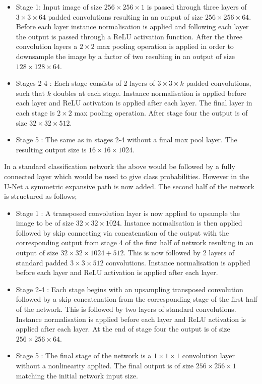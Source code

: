 \begin{itemize}
    \item Stage 1: Input image of size $256 \times 256 \times 1$ is passed through three layers of $3 \times 3 \times 64$ padded convolutions resulting in an output of
    size $256 \times 256 \times 64$. Before each layer instance normalisation is applied and following each layer the output is passed through a ReLU activation 
    function. After the three convolution layers a $2 \times 2$ max pooling operation is applied in order to downsample the image by a factor of two resulting in an output 
    of size $128 \times 128 \times 64$.
    \item Stages 2-4 : Each stage consists of 2 layers of $3 \times 3 \times k$ padded convolutions, such that $k$ doubles at each stage. Instance normalisation is applied before
    each layer and ReLU activation is applied after each layer. The final layer in each stage is $2 \times 2$ max pooling operation. After stage four the output is of size $32 \times 32 \times 512$.  
    \item Stage 5 : The same as in stages 2-4 without a final max pool layer. The resulting output size is $16 \times 16 \times 1024$.
\end{itemize} 

In a standard classification network the above would be followed by a fully connected layer which would be used to give class probabilities. However in the U-Net a symmetric
expansive path is now added. The second half of the network is structured as follows;

\begin{itemize}
    \item Stage 1 : A transposed convolution layer is now applied to upsample the image to be of size $32 \times 32 \times 1024$. Instance normalisation is then applied followed
    by skip connecting via concatenation of the output with the corresponding output from stage 4 of the first half of network resulting in an output of size $32 \times 32 \times 1024 + 512$. This is now followed by 2 layers
    of standard padded $3 \times 3 \times 512$ convolutions. Instance normalisation is applied before each layer and ReLU activation is applied after each layer.
    \item Stage 2-4 : Each stage begins with an upsampling transposed convolution followed by a skip concatenation from the corresponding stage of the first half of the network. This is followed by 
    two layers of standard convolutions. Instance normalisation is applied before each layer and ReLU activation is applied after each layer. At the end of stage four the output
    is of size  $256 \times 256 \times 64$.
    \item Stage 5 : The final stage of the network is a $1 \times 1 \times 1$ convolution layer without a nonlinearity applied. The final output is of size $256 \times 256 \times 1$ matching the 
    initial network input size.
\end{itemize}

